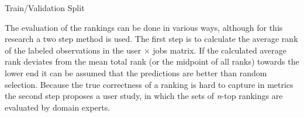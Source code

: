 \begin{table}[h]
\begin{footnotesize}

\end{footnotesize}
\caption{\label{tab:tvs} \footnotesize{Train/Validation Split}}
\end{table}

The evaluation of the rankings can be done in various ways, although for this research a two step method is used. 
The first step is to calculate the average rank of the labeled observations in the user $\times$ jobs matrix.
If the calculated average rank deviates from the mean total rank (or the midpoint of all ranks) towards the lower end it can be assumed that the predictions are better than random selection. 
Because the true correctness of a ranking is hard to capture in metrics the second step proposes a user study, in which the sets of \textit{n}-top rankings are evaluated by domain experts. 
